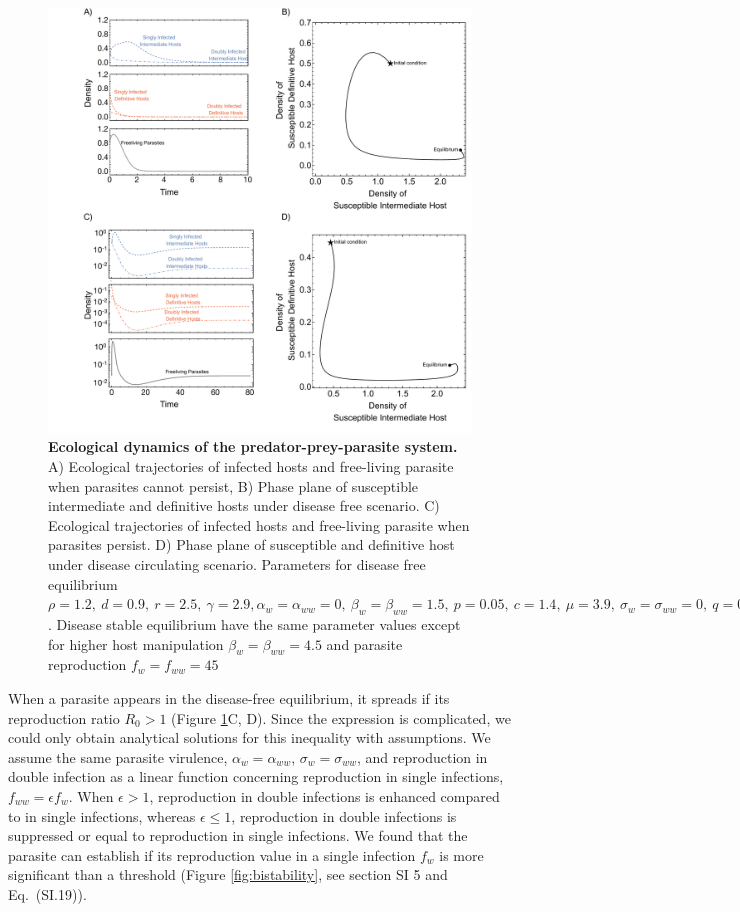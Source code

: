 \documentclass[a4paper]{scrartcl}
\begin{document}
\begin{figure}[!ht]
\captionsetup{format=plain}
\includegraphics[width=\textwidth]{Figures/ecotraject_nonlinear.pdf}
\caption{\textbf{Ecological dynamics of the predator-prey-parasite system.} A) Ecological trajectories of infected hosts and free-living parasite when parasites cannot persist, B) Phase plane of susceptible intermediate and definitive hosts under disease free scenario. C) Ecological trajectories of infected hosts and free-living parasite when parasites persist. D) Phase plane of susceptible and definitive host under disease circulating scenario. Parameters for disease free equilibrium $\rho =  1.2, \ d = 0.9, \  r = 2.5, \ \gamma =  2.9, \alpha_w = \alpha_{ww} =  0, \ \beta_w = \beta_{ww} = 1.5, \ p = 0.05, \  c = 1.4, \ \mu = 3.9, \ \sigma_w = \sigma_{ww} = 0, \ q = 0.05, \ f_w = f_{ww} = 7.5, \ \delta = 0.9, \ k = 0.26, \ h = 0.6$. Disease stable equilibrium have the same parameter values except for higher host manipulation $ \beta_w =  \beta_{ww} = 4.5$ and parasite reproduction $ f_w  = f_{ww} = 45$}
\label{fig:ecotraject:nonlinear}
\end{figure}

When a parasite appears in the disease-free equilibrium, it spreads if its reproduction ratio $R_0 > 1$ (Figure \ref{fig:ecotraject:nonlinear}C, D). 
Since the expression is complicated, we could only obtain analytical solutions for this inequality with assumptions. 
We assume the same parasite virulence, $\alpha_w = \alpha_{ww}$, $\sigma_w = \sigma_{ww}$, and reproduction in double infection as a linear function concerning reproduction in single infections, $f_{ww} = \epsilon f_w$. 
When $\epsilon > 1$, reproduction in double infections is enhanced compared to in single infections, whereas $\epsilon \leq 1$, reproduction in double infections is suppressed or equal to reproduction in single infections.
We found that the parasite can establish if its reproduction value in a single infection $f_w$ is more significant than a threshold (Figure \ref{fig:bistability}, see section SI 5 and Eq.~(SI.19)). 
\end{document}
